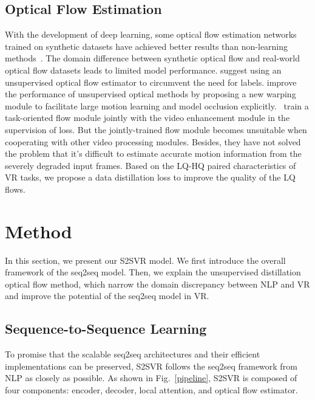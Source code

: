 \documentclass[nohyperref]{article}
\theoremstyle{plain}
\theoremstyle{definition}
\theoremstyle{remark}
\begin{document}
\vspace{-3.5mm}
\subsection{Optical Flow Estimation}
\vspace{-1.5mm}
With the development of deep learning, some optical flow estimation networks~\cite{r46,r47} trained on synthetic datasets have achieved better results than non-learning methods~\cite{r44,r45}. The domain difference between synthetic optical flow and real-world optical flow datasets leads to limited model performance. \cite{r49} suggest using an unsupervised optical flow estimator to circumvent the need for labels. \cite{wang2018occlusion} improve the performance of unsupervised optical methods by proposing a new warping module to facilitate large motion learning and model occlusion explicitly.~\cite{r16} train a task-oriented flow module jointly with the video enhancement module in the supervision of  loss. But the jointly-trained flow module becomes unsuitable when cooperating with other video processing modules. Besides, they have not solved the problem that it's difficult to estimate accurate motion information from the severely degraded input frames. Based on the LQ-HQ paired characteristics of VR tasks, we propose a data distillation loss to improve the quality of the LQ flows.  

\vspace{-1mm}
\section{Method}
\vspace{-2mm}
In this section, we present our S2SVR model. We first introduce the overall framework of the seq2seq model. Then, we explain the unsupervised distillation optical flow method, which narrow the domain discrepancy between NLP and VR and improve the potential of the seq2seq model in VR.
\vspace{-2mm}
\subsection{Sequence-to-Sequence Learning}
\vspace{-1mm}
To promise that the scalable seq2seq architectures and their efficient implementations can be preserved, S2SVR follows the seq2seq framework from NLP as closely as possible. As shown in Fig.~\ref{pipeline}, S2SVR is composed of four components: encoder, decoder, local attention, and optical flow estimator. 
\end{document}
